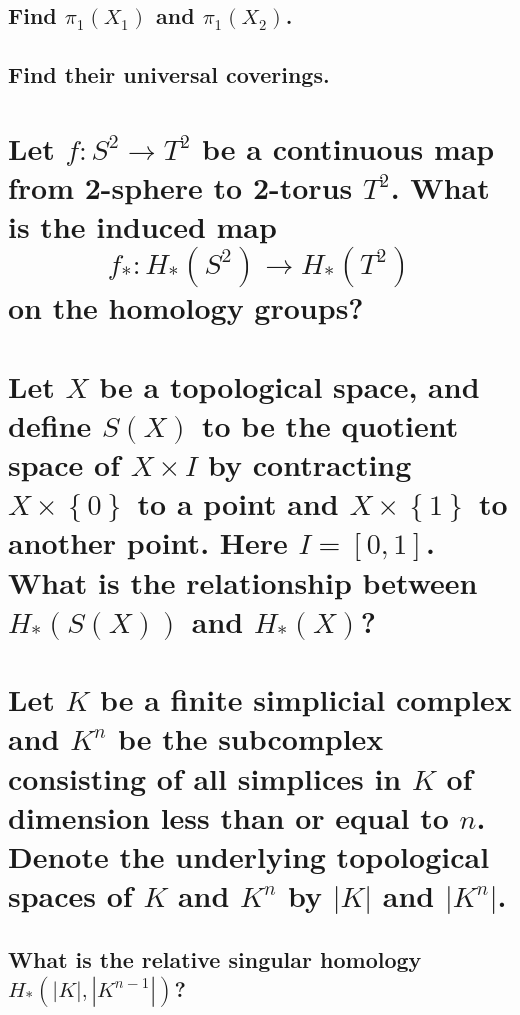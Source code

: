 \documentclass[10pt]{article}
\begin{document}
\subsection{Find $\pi_1(X_1)$ and $\pi_1(X_2)$.}

\subsection{Find their universal coverings.}

\section{Let $f: S^2 \to T^2$ be a continuous map from 2-sphere to 2-torus $T^2$. What is the
  induced map 
  $$f_* : H_*(S^2) \to H_*(T^2)$$
  on the homology groups?}

\section{Let $X$ be a topological space, and define $S(X)$ to be the quotient space of $X\times I$
  by contracting $X \times \left\{ 0 \right\} $ to a point and $X \times \left\{ 1 \right\} $ to
  another point. Here $I = [0,1]$. What is the relationship between $H_*(S(X))$ and $H_*(X)$?}

\section{Let $K$ be a finite simplicial complex and $K^n$ be the subcomplex consisting of all
  simplices in $K$ of dimension less than or equal to $n$. Denote the underlying topological spaces
  of $K$ and $K^n$ by $|K|$ and $|K^n|$.}

\subsection{What is the relative singular homology $H_*(|K|, |K^{n-1}|)$?}

\subsection{}

\subsection{}
\end{document}
